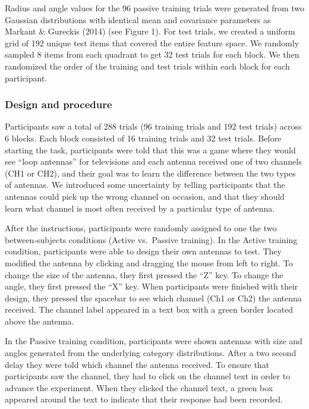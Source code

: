 \documentclass[10pt, letterpaper]{article}
\begin{document}
Radius and angle values for the 96 passive training trials were
generated from two Gaussian distributions with identical mean and
covariance parameters as Markant \& Gureckis (2014) (see Figure 1). For
test trials, we created a uniform grid of 192 unique test items that
covered the entire feature space. We randomly sampled 8 items from each
quadrant to get 32 test trials for each block. We then randomized the
order of the training and test trials within each block for each
participant.

\subsubsection{Design and procedure}\label{design-and-procedure}

Participants saw a total of 288 trials (96 training trials and 192 test
trials) across 6 blocks. Each block consisted of 16 training trials and
32 test trials. Before starting the task, participants were told that
this was a game where they would see ``loop antennas'' for televisions
and each antenna received one of two channels (CH1 or CH2), and their
goal was to learn the difference between the two types of antennas. We
introduced some uncertainty by telling participants that the antennas
could pick up the wrong channel on occasion, and that they should learn
what channel is most often received by a particular type of antenna.

After the instructions, participants were randomly assigned to one the
two between-subjects conditions (Active vs.~Passive training). In the
Active training condition, participants were able to design their own
antennas to test. They modified the antenna by clicking and dragging the
mouse from left to right. To change the size of the antenna, they first
pressed the ``Z'' key. To change the angle, they first pressed the ``X''
key. When participants were finished with their design, they pressed the
spacebar to see which channel (Ch1 or Ch2) the antenna received. The
channel label appeared in a text box with a green border located above
the antenna.

In the Passive training condition, participants were shown antennas with
size and angles generated from the underlying category distributions.
After a two second delay they were told which channel the antenna
received. To ensure that participants saw the channel, they had to click
on the channel text in order to advance the experiment. When they
clicked the channel text, a green box appeared around the text to
indicate that their response had been recorded.
\end{document}
